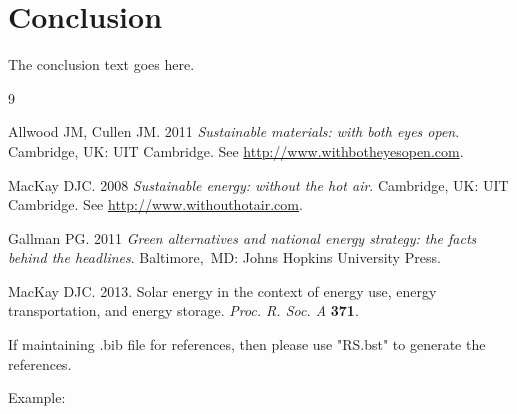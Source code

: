 \documentclass[openacc]{rsproca_new}%
\begin{document}
\section{Conclusion}
The conclusion text goes here.\vskip6pt

\enlargethispage{20pt}




\vskip2pc


\begin{thebibliography}{9}

 Allwood JM, Cullen JM. 2011 \textit{Sustainable materials:  with both eyes open}.
Cambridge, UK: UIT Cambridge. See \href{http://www.withbotheyesopen.com}{http://www.withbotheyesopen.com}.

  MacKay DJC. 2008  \textit{Sustainable energy:  without the hot air}.
 Cambridge, UK: UIT Cambridge. See \href{http://www.withouthotair.com}{http://www.withouthotair.com}.

 Gallman PG. 2011  \textit{Green alternatives and national energy strategy: the facts
 behind the headlines}.  Baltimore,\ MD: Johns Hopkins University Press.

 MacKay DJC. 2013.  Solar energy in the context of energy use, energy transportation, and
 energy storage. \textit{Proc. R. Soc. A} \textbf{371}.

\end{thebibliography}

\noindent If maintaining .bib file for references, then please use "RS.bst" to generate the references.

\noindent Example:

\verb++ %

\verb++ %
\end{document}
